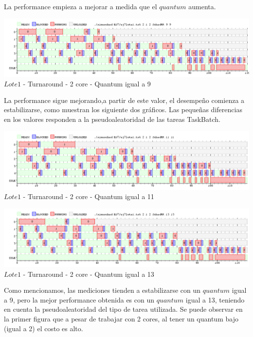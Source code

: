  
 \indent La performance empieza a mejorar a medida que el $quantum$ aumenta.
 
   \begin{center}
    	\includegraphics[width=450pt]{./EJ7/ej7tour2core4quan.png}
	{$Lote 1$ - Turnaround - 2 core - Quantum igual a 9}	
 \end{center}

  
   \indent La performance sigue mejorando,a partir de este valor, el desempeño comienza a estabilizarse, como muestran los siguiente dos gráficos. 
   Las pequeñas diferencias en los valores responden a la pseudoaleatoridad de las tareas TaskBatch.\\
  
   \begin{center}
    	\includegraphics[width=450pt]{./EJ7/ej7tour2core5quan.png}
	{$Lote 1$ - Turnaround - 2 core - Quantum igual a 11}	
 \end{center}
 

    \begin{center}
    	\includegraphics[width=450pt]{./EJ7/ej7tour2core8quan.png}
	{$Lote 1$ - Turnaround - 2 core - Quantum igual a 13}	
 \end{center}

 \indent Como mencionamos, las mediciones tienden a estabilizarse con un $quantum$ igual a 9, pero la mejor performance
 obtenida es con un $quantum$ igual a 13, teniendo en cuenta la pseudoaleatoridad del tipo de tarea utilizada.
 \indent Se puede observar en la primer figura que a pesar de trabajar con 2 cores, al tener un quantum bajo (igual a 2) 
 el costo es alto.\\
  

